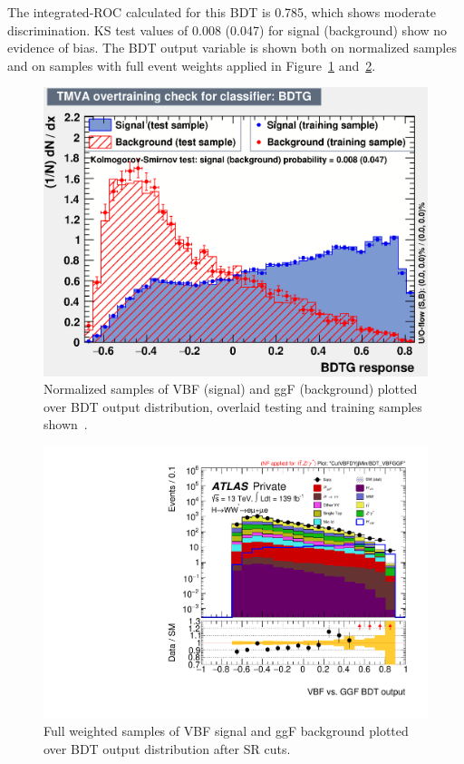 The integrated-ROC calculated for this BDT is 0.785, which shows moderate discrimination. KS test values of 0.008 (0.047) for signal (background) show no evidence of bias. The BDT output variable is shown both on normalized samples and on samples with full event weights applied in Figure~\ref{fig:ggFVBFBDTresult} and~\ref{fig:ggFVBFBDTresult2}. 

\begin{figure}[!htbp]
\centering
  \includegraphics[width=.45\linewidth]{Pictures/ggFVBF/overtrain_BDTG.eps}
\caption{Normalized samples of VBF (signal) and ggF (background) plotted over BDT output distribution, overlaid testing and training samples shown~\cite{ourSupportNote}.}
\label{fig:ggFVBFBDTresult}
\end{figure}

\begin{figure}[!htbp]
\centering
  \includegraphics[width=.45\linewidth]{Pictures/run2-emme-CutVBFDYjjMin-BDT_VBFGGF-log.pdf}
\caption{Full weighted samples of VBF signal and ggF background plotted over BDT output distribution after SR cuts.}
\label{fig:ggFVBFBDTresult2}
\end{figure}

%


